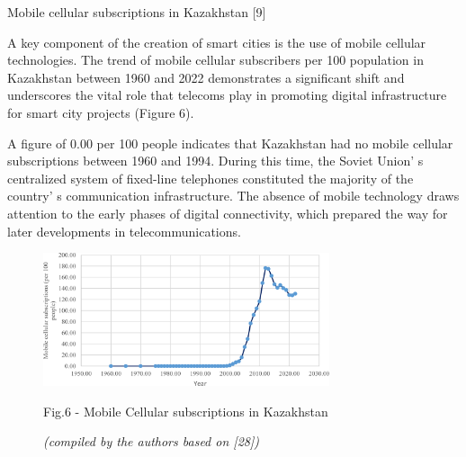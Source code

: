 \begin{multicols}{2}
Mobile cellular subscriptions in Kazakhstan {[}9{]}

A key component of the creation of smart cities is the use of mobile
cellular technologies. The trend of mobile cellular subscribers per 100
population in Kazakhstan between 1960 and 2022 demonstrates a
significant shift and underscores the vital role that telecoms play in
promoting digital infrastructure for smart city projects (Figure 6).

A figure of 0.00 per 100 people indicates that Kazakhstan had no mobile
cellular subscriptions between 1960 and 1994. During this time, the
Soviet Union' s centralized system of fixed-line
telephones constituted the majority of the country' s
communication infrastructure. The absence of mobile technology draws
attention to the early phases of digital connectivity, which prepared
the way for later developments in telecommunications.
\end{multicols}

\begin{figure}[H]
	\centering
	\includegraphics[width=0.75\textwidth]{media/ekon/Graph_17}
	\caption*{Fig.6 - Mobile Cellular subscriptions in Kazakhstan}
	\caption*{\normalfont \emph{(compiled by the authors based on {[}28{]})}}
\end{figure}

